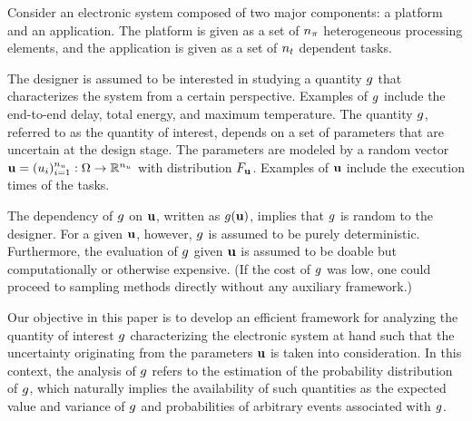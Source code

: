 Consider an electronic system composed of two major components: a platform and
an application. The platform is given as a set of ${n_\pi}$ heterogeneous processing
elements, and the application is given as a set of ${n_t}$ dependent tasks.

The designer is assumed to be interested in studying a quantity $g$ that
characterizes the system from a certain perspective. Examples of $g$ include
the end-to-end delay, total energy, and maximum temperature. The quantity $g$,
referred to as the quantity of interest, depends on a set of parameters that are
uncertain at the design stage. The parameters are modeled by a random vector
$\mathbf{u} = (u_i)_{i = 1}^{n_u}: \Omega \to \mathbb{R}^{n_u}$ with distribution
$F_{\mathbf{u}}$. Examples of $\mathbf{u}$ include the execution times of the tasks.

The dependency of $g$ on $\mathbf{u}$, written as $g(\mathbf{u})$, implies that $g$ is
random to the designer. For a given $\mathbf{u}$, however, $g$ is assumed to be purely
deterministic. Furthermore, the evaluation of $g$ given $\mathbf{u}$ is assumed to be
doable but computationally or otherwise expensive. (If the cost of $g$ was low,
one could proceed to sampling methods directly without any auxiliary framework.)

Our objective in this paper is to develop an efficient framework for analyzing
the quantity of interest $g$ characterizing the electronic system at hand such
that the uncertainty originating from the parameters $\mathbf{u}$ is taken into
consideration. In this context, the analysis of $g$ refers to the estimation of
the probability distribution of $g$, which naturally implies the availability
of such quantities as the expected value and variance of $g$ and probabilities
of arbitrary events associated with $g$.

